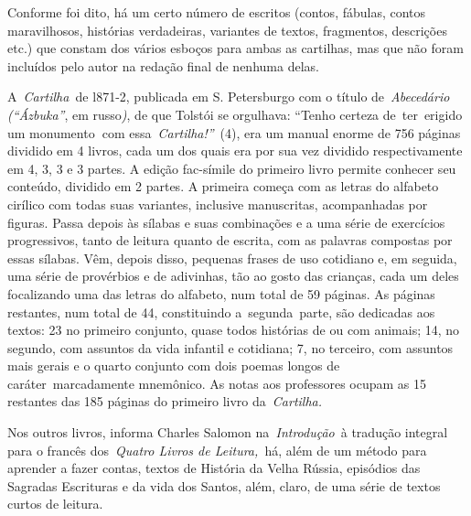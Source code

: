 Conforme foi dito, há um certo número de escritos (contos, fábulas,
contos maravilhosos, histórias verdadeiras, variantes de textos,
fragmentos, descrições etc.) que constam dos vários esboços para ambas
as cartilhas, mas que não foram incluídos pelo autor na redação final de
nenhuma delas.

A~\emph{Cartilha~}de l871-2, publicada em S. Petersburgo com o título
de~\emph{Abecedário (``Ázbuka''}, em russo\emph{)}, de que Tolstói se
orgulhava: ``Tenho certeza de~ter~erigido um monumento\textbf{~}com
essa~\emph{Cartilha!''}~(4), era um manual enorme de 756 páginas
dividido em 4 livros, cada um dos quais era por sua vez dividido
respectivamente em 4, 3, 3 e 3 partes. A edição fac-símile do primeiro
livro permite conhecer seu conteúdo, dividido em 2 partes. A primeira
começa com as letras do alfabeto cirílico com todas suas variantes,
inclusive manuscritas, acompanhadas por figuras. Passa depois às sílabas
e suas combinações e a uma série de exercícios progressivos, tanto de
leitura quanto de escrita, com as palavras compostas por essas sílabas.
Vêm, depois disso, pequenas frases de uso cotidiano e, em seguida, uma
série de provérbios e de adivinhas, tão ao gosto das crianças, cada um
deles focalizando uma das letras do alfabeto, num total de 59 páginas.
As páginas restantes, num total de 44, constituindo a~segunda~parte, são
dedicadas aos textos: 23 no primeiro conjunto, quase todos histórias de
ou com animais; 14, no segundo, com assuntos da vida infantil e
cotidiana; 7, no terceiro, com assuntos mais gerais e o quarto conjunto
com dois poemas longos de caráter~marcadamente mnemônico. As notas aos
professores ocupam as 15 restantes das 185 páginas do primeiro livro
da~\emph{Cartilha.}

Nos outros livros, informa Charles Salomon na\emph{~Introdução}~à
tradução integral para o francês dos~\emph{Quatro Livros de
Leitura,~}há, além de um método para aprender a fazer contas, textos de
História da Velha Rússia, episódios das Sagradas Escrituras e da vida
dos Santos, além, claro, de uma série de textos curtos de leitura.

